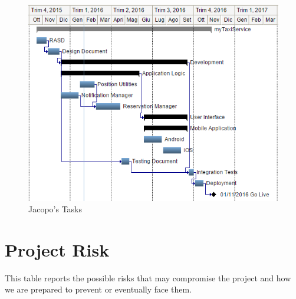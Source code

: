 \documentclass[a4paper]{article}
\begin{document}
\begin{figure}[H]
\includegraphics[width=.7\textwidth]{GANTT_CHART_JACOPO}
\centering
\caption{Jacopo's Tasks}
\label{fig:GANTT_CHART_JACOPO}
\end{figure}

\section{Project Risk}
This table reports the possible risks that may compromise the project and how we are prepared to prevent or eventually face them.
\renewcommand{\arraystretch}{2}
\end{document}

